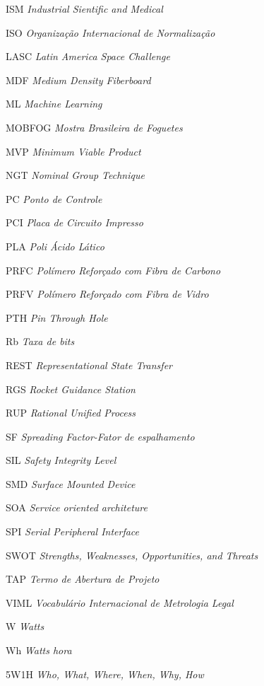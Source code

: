 \begin{siglas}
   \item [ISM] \textit{Industrial Sientific and Medical}
   \item [ISO] \textit{Organização Internacional de Normalização}
   \item [LASC] \textit{Latin America Space Challenge}
   \item [MDF] \textit{Medium Density Fiberboard}
   \item [ML] \textit{Machine Learning}
   \item [MOBFOG] \textit{Mostra Brasileira de Foguetes}
   \item [MVP] \textit{Minimum Viable Product}
   \item [NGT] \textit{Nominal Group Technique}
   \item [PC] \textit{Ponto de Controle}
   \item [PCI] \textit{Placa de Circuito Impresso}
   \item [PLA] \textit{Poli Ácido Lático}
   \item [PRFC] \textit{Polímero Reforçado com Fibra de Carbono}
   \item [PRFV] \textit{Polímero Reforçado com Fibra de Vidro}
   \item [PTH] \textit{Pin Through Hole}
   \item [Rb] \textit{Taxa de bits}
   \item [REST] \textit{Representational State Transfer}
   \item [RGS] \textit{Rocket Guidance Station}
   \item [RUP] \textit{Rational Unified Process}
   \item [SF] \textit{Spreading Factor-Fator de espalhamento}
   \item [SIL] \textit{Safety Integrity Level}
   \item [SMD] \textit{Surface Mounted Device}
   \item [SOA] \textit{Service oriented architeture}
   \item [SPI] \textit{Serial Peripheral Interface}
   \item [SWOT] \textit{Strengths, Weaknesses, Opportunities, and Threats}
   \item [TAP] \textit{Termo de Abertura de Projeto}
   \item [VIML] \textit{Vocabulário Internacional de Metrologia Legal}
   \item [W] \textit{Watts}
   \item [Wh] \textit{Watts hora}
   \item [5W1H] \textit{Who, What, Where, When, Why, How}
  
  
\end{siglas}
